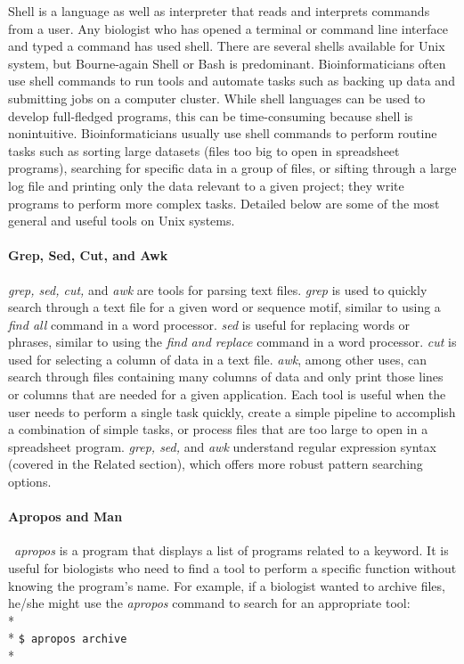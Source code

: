 \documentclass[ChapterTOCs,krantz2]{krantz} %
\begin{document}
Shell is a language as well as interpreter that reads and interprets commands
from a user. Any biologist who has opened a terminal or command line interface
and typed a command has used shell. There are several shells available for Unix
system, but Bourne-again Shell or Bash is predominant. 
Bioinformaticians often use shell commands to
run tools and automate tasks such as backing up
data and submitting jobs on a computer cluster. While shell languages can be
used to develop full-fledged programs, this can be time-consuming 
because shell is nonintuitive.  
Bioinformaticians usually use shell commands to perform routine tasks such as
sorting large datasets (files too big to open in spreadsheet programs),
searching for specific data in a group of files, or sifting through a large log
file and printing only the data relevant to a given project; they write programs to perform 
more complex tasks.  Detailed below are
some of the most general and useful tools on
Unix systems.

\paragraph{Grep, Sed, Cut, and Awk}

\emph{grep, sed, cut,} and \emph{awk} are tools for parsing text files.
\emph{grep} is used to
quickly search through a  text file for a given word or sequence
motif, similar to using a \emph{find all} command in a word processor.  \emph{sed} is
useful for replacing words or phrases,
similar to using the \emph{find and replace} command in a word processor.
\emph{cut} is
used for selecting a column of data in a text file.  \emph{awk}, among other uses, 
can search through files containing many columns of data and only print
those lines or columns that are needed for a given application.  
Each tool is useful when the user needs to
perform a single task quickly, create a simple pipeline to accomplish a
combination of simple tasks, or process files that are too large to open in a
spreadsheet program.  \emph{grep, sed,} and \emph{awk} understand regular expression
syntax (covered in the Related section), which offers more robust pattern searching options.  

\paragraph{Apropos and Man}

\ \emph{apropos}
is a program that
displays a list of programs related to a keyword. It is
useful for biologists who need to find a tool to perform a specific function without 
knowing the program's name. For example, if a biologist wanted to archive files,
he/she might use the \emph{apropos} command to search for an appropriate tool:\\* \\*
\texttt{\$ apropos archive}\\*
\end{document}
